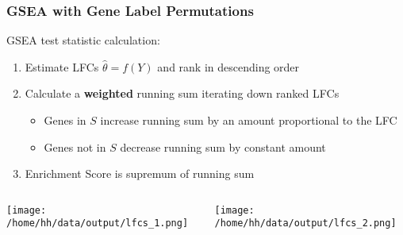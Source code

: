 \documentclass[11pt]{beamer}
\begin{document}
\begin{frame}
  \frametitle{GSEA with Gene Label Permutations}

  GSEA test statistic calculation:
  \begin{enumerate}
    \item Estimate LFCs \(\hat{\theta}=f(Y)\) and rank in descending order
    \item Calculate a \textbf{weighted} running sum iterating down ranked LFCs
      \begin{itemize}
        \item Genes in \(S\) increase running sum by an amount proportional to the LFC
        \item Genes not in \(S\) decrease running sum by constant amount
      \end{itemize}
    \item Enrichment Score is supremum of running sum
  \end{enumerate}
     \begin{columns}
     \begin{column}{0.5\textwidth}
      \begin{center}
        \texttt{[image: /home/hh/data/output/lfcs\_1.png]}
      \end{center}
    \end{column}
    \vrule{}
    \begin{column}{0.5\textwidth}  %
      \begin{center}
        \texttt{[image: /home/hh/data/output/lfcs\_2.png]}
      \end{center}
    \end{column}
   \end{columns}
\end{frame}
\end{document}
